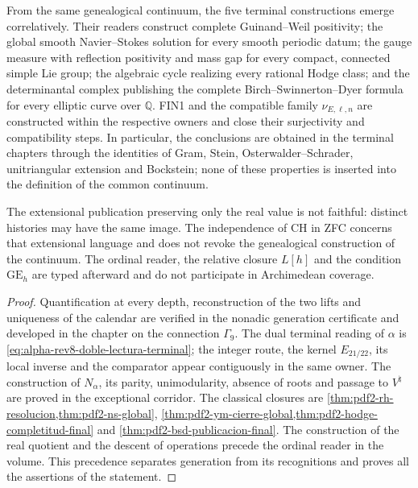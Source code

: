 \begin{theorem}
From the same genealogical continuum, the five terminal
constructions emerge correlatively. Their readers construct complete Guinand--Weil
positivity; the global smooth Navier--Stokes solution for every smooth periodic
datum; the gauge measure with reflection positivity and mass
gap for every compact, connected simple Lie group; the algebraic cycle
realizing every rational Hodge class; and the determinantal complex
publishing the complete Birch--Swinnerton--Dyer formula for every elliptic
curve over \(\mathbb Q\). FIN1 and the compatible family
\(\nu_{E,\ell,n}\) are constructed within the respective owners and
close their surjectivity and compatibility steps. In particular, the conclusions are obtained in the terminal
chapters through the identities
of Gram, Stein, Osterwalder--Schrader, unitriangular extension and Bockstein;
none of these properties is inserted into the definition of the common continuum.

The extensional publication preserving only the real value is not faithful:
distinct histories may have the same image. The independence of CH in
ZFC concerns that extensional language and does not revoke the genealogical
construction of the continuum. The ordinal reader, the relative closure \(L[h]\)
and the condition \(\mathrm{GE}_h\) are typed afterward and do not participate in
Archimedean coverage.
\end{theorem}

\begin{proof}
Quantification at every depth, reconstruction of the two
lifts and uniqueness of the calendar are verified in the nonadic generation
certificate and developed in the chapter on the connection
\(\Gamma_9\). The dual terminal reading of \(\alpha\) is
\eqref{eq:alpha-rev8-doble-lectura-terminal}; the integer route, the kernel
\(E_{21/22}\), its local inverse and the comparator appear contiguously in
the same owner. The construction of \(N_\alpha\), its parity,
unimodularity, absence of roots and passage to \(V^\natural\) are proved in
the exceptional corridor. The classical closures are
\cref{thm:pdf2-rh-resolucion,thm:pdf2-ns-global},
\cref{thm:pdf2-ym-cierre-global,thm:pdf2-hodge-completitud-final} and
\cref{thm:pdf2-bsd-publicacion-final}. The construction of the real quotient and the
descent of operations precede the ordinal reader in the volume. This
precedence separates generation from its recognitions and proves all the
assertions of the statement.
\end{proof}

